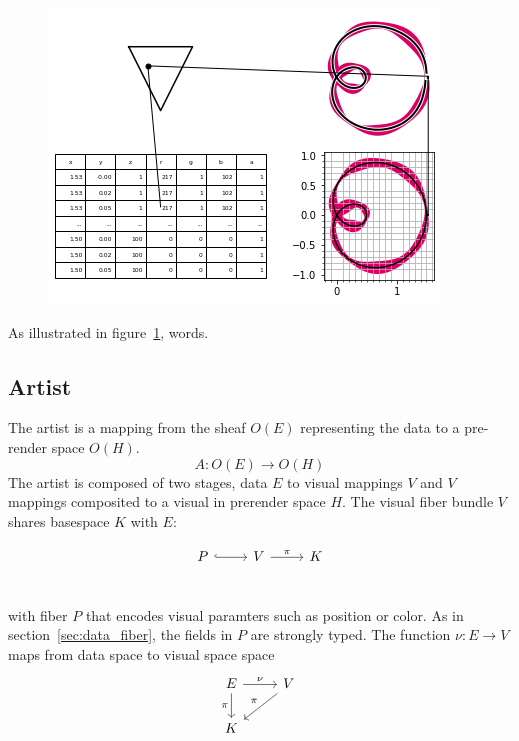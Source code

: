 \documentclass[../main.tex]{subfiles}
\begin{document}
\begin{figure}[h]
    \includegraphics[width=.4\linewidth]{figures/sections/math/render.png}
    \caption{}
    \label{fig:render}
\end{figure}

As illustrated in figure~\ref{fig:render}, words.

\subsection{Artist}

The artist is a mapping from the sheaf $O(E)$ representing the data to a pre-render space $O(H)$. 
\begin{equation}
    A: O(E) \rightarrow O(H)
\end{equation}
The artist is composed of two stages, data $E$ to visual mappings $V$ and $V$ mappings composited to a visual in prerender space $H$. The visual fiber bundle $V$ shares basespace $K$ with $E$:

\begin{equation}
    \begin{tikzcd}
        P \arrow[r, hook] & V \arrow[r, "\pi"] & K\\   
    \end{tikzcd}
\end{equation}

with fiber $P$ that encodes visual paramters such as position or color. As in section~\ref{sec:data_fiber}, the fields in $P$ are strongly typed. The function $\nu: E \rightarrow V$ maps from data space to visual space  \cite{carpendaleVisualRepresentationSemiology,bertinIIPropertiesGraphic2011,munznerWhatDataAbstraction2014} space
\begin{equation}
    \begin{tikzcd}
        E \arrow[d, "\pi"'] \arrow[r, "\nu"] & V \arrow[ld, "\pi"'] \\
        K                                    &                     
        \end{tikzcd}
\end{equation}
\end{document}
